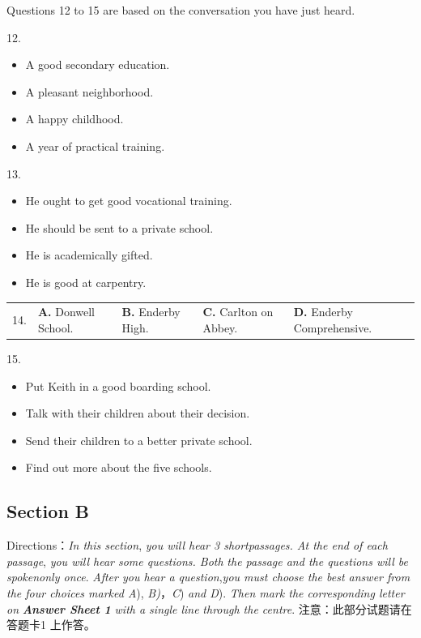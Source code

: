 \documentclass[UTF8,11pt]{ctexart}
\begin{document}
Questions 12 to 15 are based on the conversation you have just heard.


12.


\begin{itemize}[leftmargin=2em,itemsep=.2em,topsep=.4em]\item[A.] A good secondary education.
\item[B.] A pleasant neighborhood.
\item[C.] A happy childhood.
\item[D.] A year of practical training.
\end{itemize}

13.


\begin{itemize}[leftmargin=2em,itemsep=.2em,topsep=.4em]\item[A.] He ought to get good vocational training.
\item[B.] He should be sent to a private school.
\item[C.] He is academically gifted.
\item[D.] He is good at carpentry.
\end{itemize}

\noindent\begin{tabularx}{\linewidth}{@{}lXXXX@{}}14. & \textbf{A.} Donwell School. & \textbf{B.} Enderby High. & \textbf{C.} Carlton on Abbey. & \textbf{D.} Enderby Comprehensive.\\\end{tabularx}\par

15.


\begin{itemize}[leftmargin=2em,itemsep=.2em,topsep=.4em]\item[A.] Put Keith in a good boarding school.
\item[B.] Talk with their children about their decision.
\item[C.] Send their children to a better private school.
\item[D.] Find out more about the five schools.
\end{itemize}

\subsection*{\textbf{Section B}}


Directions：\textit{In this section},\textit{ you will hear 3 shortpassages. At the end of each passage},\textit{ you will hear some questions. Both} \textit{the passage and the questions will be spokenonly once}.\textit{ After you hear a question},\textit{you must choose the best answer from} \textit{the four choices marked A}),\textit{ B)}，\textit{C})\textit{ and D}).\textit{ Then mark the corresponding letter on}\textbf{\textit{ Answer Sheet 1}}\textit{ with a single line} \textit{through the centre}. 注意：此部分试题请在答题卡1 上作答。
\end{document}
